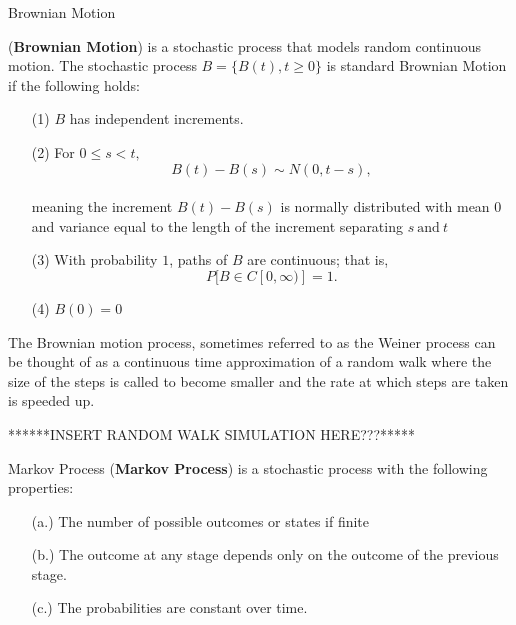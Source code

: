 \begin{frame}{Brownian Motion}
\begin{definition}(\textbf{Brownian Motion}) is a stochastic process that models random continuous motion. The stochastic process $B=\{B(t), t\geq 0\}$ is standard Brownian Motion if the following holds:
\begin{enumerate}
\item[(1)]
$B$ has independent increments.
\item[(2)]
For $0 \leq s < t,$ $$B(t)-B(s) \sim N(0,t-s),$$\\
meaning the increment $B(t)-B(s)$ is normally distributed with mean $0$ and variance equal to the length of the increment separating $s \ \text{and} \ t$
\item[(3)] With probability $1$, paths of $B$ are continuous; that is, $$P[B \in C[0, \infty)]=1.$$
\item[(4)] $B(0)=0$ 
\end{enumerate}
\end{definition}

The Brownian motion process, sometimes referred to as the Weiner process can be thought of as a continuous time approximation of a random walk where the size of the steps is called to become smaller and the rate at which steps are taken is speeded up. \\
\end{frame}

\begin{frame}
******INSERT RANDOM WALK SIMULATION HERE???*****
\end{frame}

\begin{frame}{Markov Process}
(\textbf{Markov Process}) is a stochastic process with the following properties: 
\begin{enumerate}
\item[(a.)] The number of possible outcomes or states if finite
\item[(b.)] The outcome at any stage depends only on the outcome of the previous stage.
\item[(c.)] The probabilities are constant over time.   
\end{enumerate}
\end{frame}

